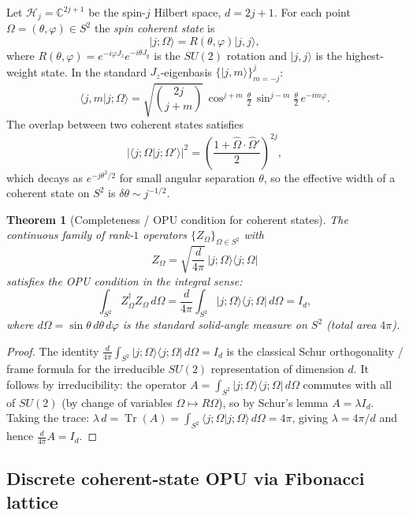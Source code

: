 \documentclass[12pt,a4paper]{article}
\newtheorem{theorem}{Theorem}[section]
\DeclareMathOperator{\Tr}{Tr}
\begin{document}
Let $\mathcal{H}_j = \mathbb{C}^{2j+1}$ be the spin-$j$ Hilbert space, $d =
2j+1$.  For each point $\Omega = (\theta,\varphi) \in S^2$ the
\emph{spin coherent state} is
\[
  |j;\Omega\rangle = R(\theta,\varphi)|j,j\rangle,
\]
where $R(\theta,\varphi) = e^{-i\varphi J_z}e^{-i\theta J_y}$ is the
$SU(2)$ rotation and $|j,j\rangle$ is the highest-weight state.  In the
standard $J_z$-eigenbasis $\{|j,m\rangle\}_{m=-j}^{j}$:
\[
  \langle j,m|j;\Omega\rangle
  = \sqrt{\binom{2j}{j+m}}\,\cos^{j+m}\!\tfrac{\theta}{2}\,
    \sin^{j-m}\!\tfrac{\theta}{2}\,e^{-im\varphi}.
\]
The overlap between two coherent states satisfies
\[
  |\langle j;\Omega|j;\Omega'\rangle|^2
  = \left(\frac{1+\hat\Omega\cdot\hat\Omega'}{2}\right)^{2j},
\]
which decays as $e^{-j\theta^2/2}$ for small angular separation $\theta$,
so the effective width of a coherent state on $S^2$ is $\delta\theta \sim j^{-1/2}$.

\begin{theorem}[Completeness / OPU condition for coherent states]
  \label{thm:cs_completeness}
  The continuous family of rank-$1$ operators $\{Z_\Omega\}_{\Omega\in S^2}$
  with
  \[
    Z_\Omega = \sqrt{\frac{d}{4\pi}}\,|j;\Omega\rangle\langle j;\Omega|
  \]
  satisfies the OPU condition in the integral sense:
  \[
    \int_{S^2} Z_\Omega^\dagger Z_\Omega\,d\Omega
    = \frac{d}{4\pi}\int_{S^2}|j;\Omega\rangle\langle j;\Omega|\,d\Omega
    = I_d,
  \]
  where $d\Omega = \sin\theta\,d\theta\,d\varphi$ is the standard
  solid-angle measure on $S^2$ (total area $4\pi$).
\end{theorem}
\begin{proof}
  The identity $\frac{d}{4\pi}\int_{S^2}|j;\Omega\rangle\langle j;\Omega|\,d\Omega
  = I_d$ is the classical Schur orthogonality / frame formula for the
  irreducible $SU(2)$ representation of dimension $d$.  It follows by
  irreducibility: the operator $A = \int_{S^2}|j;\Omega\rangle\langle j;\Omega|\,d\Omega$
  commutes with all of $SU(2)$ (by change of variables $\Omega\mapsto
  R\Omega$), so by Schur's lemma $A = \lambda I_d$.  Taking the trace:
  $\lambda\,d = \Tr(A) = \int_{S^2}\langle j;\Omega|j;\Omega\rangle\,d\Omega = 4\pi$,
  giving $\lambda = 4\pi/d$ and hence $\frac{d}{4\pi}A = I_d$.
\end{proof}

\subsection{Discrete coherent-state OPU via Fibonacci lattice}
\end{document}
